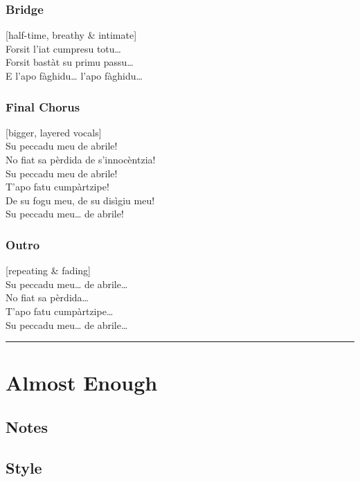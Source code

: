 \subsubsection{Bridge}\label{bridge-23}

{[}half-time, breathy \& intimate{]}\\
Forsit l'iat cumpresu totu\ldots{}\\
Forsit bastàt su primu passu\ldots{}\\
E l'apo fàghidu\ldots{} l'apo fàghidu\ldots{}

\subsubsection{Final Chorus}\label{final-chorus-1}

{[}bigger, layered vocals{]}\\
Su peccadu meu de abrile!\\
No fiat sa pèrdida de s'innocèntzia!\\
Su peccadu meu de abrile!\\
T'apo fatu cumpàrtzipe!\\
De su fogu meu, de su disìgiu meu!\\
Su peccadu meu\ldots{} de abrile!

\subsubsection{Outro}\label{outro-8}

{[}repeating \& fading{]}\\
Su peccadu meu\ldots{} de abrile\ldots{}\\
No fiat sa pèrdida\ldots{}\\
T'apo fatu cumpàrtzipe\ldots{}\\
Su peccadu meu\ldots{} de abrile\ldots{}

\begin{center}\rule{0.5\linewidth}{0.5pt}\end{center}

\section{Almost Enough}\label{almost-enough}

\subsection{Notes}\label{notes-34}

\subsection{Style}\label{style-33}


